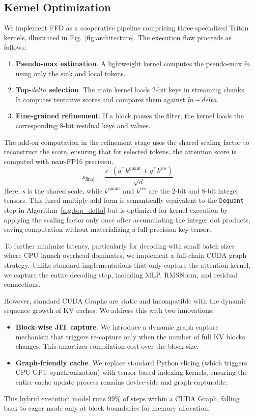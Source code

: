 \documentclass[]{mosi}
\def\bm#1{#1}%
\def\delta{delta}%
\theoremstyle{plain}
\theoremstyle{definition}
\theoremstyle{remark}
\begin{document}
\subsection{Kernel Optimization}
We implement FFD as a cooperative pipeline comprising three specialized Triton kernels, illustrated in Fig.~\ref{fig:architecture}. The execution flow proceeds as follows:
\begin{enumerate}
    \itemsep0em
    \item \textbf{Pseudo-max estimation}. A lightweight kernel computes the pseudo-max $\tilde{m}$ using only the sink and local tokens.
    \item \textbf{Top-$\bm\delta$ selection}. The main kernel loads 2-bit keys in streaming chunks. It computes tentative scores and compares them against $\tilde{m} - \delta$.
    \item \textbf{Fine-grained refinement}. If a block passes the filter, the kernel loads the corresponding 8-bit residual keys and values.
\end{enumerate}
The add-on computation in the refinement stage uses the shared scaling factor to reconstruct the score, ensuring that for selected tokens, the attention score is computed with near-FP16 precision.
\begin{equation}
s_\text{final} = \frac{s \cdot (\bm{q}^\top\bm{k}^\text{quant} + \bm{q}^\top\bm{k}^\text{res})}{\sqrt{d}}
\end{equation}
Here, $s$ is the shared scale, while $\bm{k}^\text{quant}$ and $\bm{k}^\text{res}$ are the 2-bit and 8-bit integer tensors. This fused multiply-add form is semantically equivalent to the \texttt{Dequant} step in Algorithm~\ref{alg:top_delta} but is optimized for kernel execution by applying the scaling factor only once after accumulating the integer dot products, saving computation without materializing a full-precision key tensor.

To further minimize latency, particularly for decoding with small batch sizes where CPU launch overhead dominates, we implement a full-chain CUDA graph strategy. Unlike standard implementations that only capture the attention kernel, we capture the entire decoding step, including MLP, RMSNorm, and residual connections.

However, standard CUDA Graphs are static and incompatible with the dynamic sequence growth of KV caches. We address this with two innovations:
\begin{itemize}
    \itemsep0em
    \item \textbf{Block-wise JIT capture}. We introduce a dynamic graph capture mechanism that triggers re-capture only when the number of full KV blocks changes. This amortizes compilation cost over the block size.
    \item \textbf{Graph-friendly cache}. We replace standard Python slicing (which triggers CPU-GPU synchronization) with tensor-based indexing kernels, ensuring the entire cache update process remains device-side and graph-capturable.
\end{itemize}
This hybrid execution model runs 99\% of steps within a CUDA Graph, falling back to eager mode only at block boundaries for memory allocation.
\end{document}
